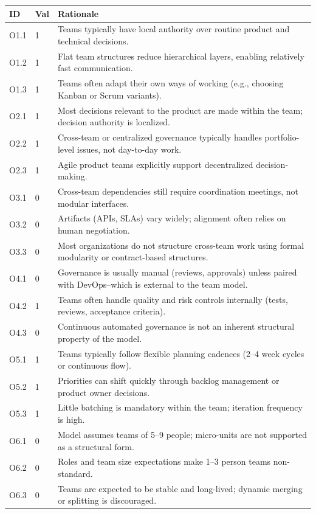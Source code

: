 \documentclass[11pt, a4paper, twocolumn]{article} %
\begin{document}
\begin{table}[h]
\centering
\begingroup\small
\setlength{\tabcolsep}{4pt}%
\begin{tabularx}{\linewidth}{llX}
\toprule
\textbf{ID} & \textbf{Val} & \textbf{Rationale} \\
\midrule
O1.1 & 1 &
Teams typically have local authority over routine product and technical decisions. \\
O1.2 & 1 &
Flat team structures reduce hierarchical layers, enabling relatively fast communication. \\
O1.3 & 1 &
Teams often adapt their own ways of working (e.g., choosing Kanban or Scrum variants). \\
\midrule
O2.1 & 1 &
Most decisions relevant to the product are made within the team; decision authority is localized. \\
O2.2 & 1 &
Cross-team or centralized governance typically handles portfolio-level issues, not day-to-day work. \\
O2.3 & 1 &
Agile product teams explicitly support decentralized decision-making. \\
\midrule
O3.1 & 0 &
Cross-team dependencies still require coordination meetings, not modular interfaces. \\
O3.2 & 0 &
Artifacts (APIs, SLAs) vary widely; alignment often relies on human negotiation. \\
O3.3 & 0 &
Most organizations do not structure cross-team work using formal modularity or contract-based structures. \\
\midrule
O4.1 & 0 &
Governance is usually manual (reviews, approvals) unless paired with DevOps--which is external to the team model. \\
O4.2 & 1 &
Teams often handle quality and risk controls internally (tests, reviews, acceptance criteria). \\
O4.3 & 0 &
Continuous automated governance is not an inherent structural property of the model. \\
\midrule
O5.1 & 1 &
Teams typically follow flexible planning cadences (2–4 week cycles or continuous flow). \\
O5.2 & 1 &
Priorities can shift quickly through backlog management or product owner decisions. \\
O5.3 & 1 &
Little batching is mandatory within the team; iteration frequency is high. \\
\midrule
O6.1 & 0 &
Model assumes teams of 5–9 people; micro-units are not supported as a structural form. \\
O6.2 & 0 &
Roles and team size expectations make 1–3 person teams non-standard. \\
O6.3 & 0 &
Teams are expected to be stable and long-lived; dynamic merging or splitting is discouraged. \\
\bottomrule
\end{tabularx}
\endgroup
\end{table}
\end{document}
